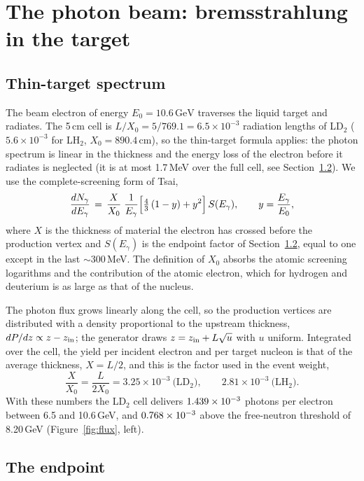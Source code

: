 \documentclass[11pt,a4paper]{article}
\newcommand{\Eg}{E_\gamma}
\newcommand{\GeV}{\,\mathrm{GeV}}
\begin{document}
\section{The photon beam: bremsstrahlung in the target}
\label{sec:brems}

\subsection{Thin-target spectrum}

The beam electron of energy $E_0=10.6\GeV$ traverses the liquid target and radiates.  The 5\,cm cell is
$L/X_0 = 5/769.1 = 6.5\times10^{-3}$ radiation lengths of LD$_2$ ($5.6\times10^{-3}$ for LH$_2$,
$X_0=890.4$\,cm), so the thin-target formula applies: the photon spectrum is linear in the thickness
and the energy loss of the electron before it radiates is neglected (it is at most 1.7\,MeV over the
full cell, see Section~\ref{sec:endpoint}).  We use the complete-screening form of Tsai,
\begin{equation}
\frac{dN_\gamma}{d\Eg}\,=\,\frac{X}{X_0}\;\frac{1}{\Eg}\Bigl[\tfrac43\,(1-y)+y^2\Bigr]\,S(\Eg),
\qquad y=\frac{\Eg}{E_0},
\label{eq:tsai}
\end{equation}
where $X$ is the thickness of material the electron has crossed before the production vertex and
$S(\Eg)$ is the endpoint factor of Section~\ref{sec:endpoint}, equal to one except in the last
$\sim$300\,MeV.  The definition of $X_0$ absorbs the atomic screening logarithms and the contribution
of the atomic electron, which for hydrogen and deuterium is as large as that of the nucleus.

The photon flux grows linearly along the cell, so the production vertices are distributed with a
density proportional to the upstream thickness, $dP/dz\propto z-z_{\rm in}$; the generator draws
$z = z_{\rm in} + L\sqrt{u}$ with $u$ uniform.  Integrated over the cell, the yield per incident
electron and per target nucleon is that of the average thickness, $X=L/2$, and this is the factor used
in the event weight,
\begin{equation}
\frac{X}{X_0}=\frac{L}{2X_0}=3.25\times10^{-3}\ \text{(LD$_2$)},\qquad 2.81\times10^{-3}\ \text{(LH$_2$)}.
\end{equation}
With these numbers the LD$_2$ cell delivers $1.439\times10^{-3}$ photons per electron
between 6.5 and 10.6\,GeV, and $0.768\times10^{-3}$ above the free-neutron threshold of
8.20\,GeV (Figure~\ref{fig:flux}, left).

\subsection{The endpoint}
\label{sec:endpoint}
\end{document}
